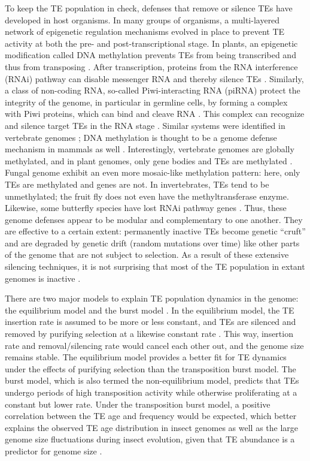 To keep the TE population in check, defenses that remove or silence TEs
have developed in host organisms. In many groups of organisms, a
multi-layered network of epigenetic regulation mechanisms evolved in
place to prevent TE activity at both the pre- and post-transcriptional
stage. In plants, an epigenetic modification called DNA methylation
prevents TEs from being transcribed and thus from transposing
\citep{Slotkin2007, Lisch2009}. After transcription, proteins from the
RNA interference (RNAi) pathway can disable messenger RNA and thereby
silence TEs \citep{Buchon2006}. Similarly, a class of non-coding RNA,
so-called Piwi-interacting RNA (piRNA) protect the integrity of the
genome, in particular in germline cells, by forming a complex with Piwi
proteins, which can bind and cleave RNA \citep{Zeng2011}. This complex
can recognize and silence target TEs in the RNA stage \citep{Siomi2011, Mondal2018}.
Similar systems were identified in vertebrate genomes \citep{Suzuki2008,
Schubeler2015}; DNA methylation is thought to be a genome defense
mechanism in mammals as well \citep{Yoder1997}. Interestingly,
vertebrate genomes are globally methylated, and in plant genomes, only
gene bodies and TEs are methylated \citep{Suzuki2008}. Fungal genome
exhibit an even more mosaic-like methylation pattern: here, only TEs are
methylated and genes are not. In invertebrates, TEs tend to be
unmethylated; the fruit fly  does not
even have the methyltransferase enzyme. Likewise, some butterfly species
have lost RNAi pathway genes \citep{Pauli2016}. Thus, these genome
defenses appear to be modular and complementary to one another. They are
effective to a certain extent: permanently inactive TEs become genetic
``cruft'' and are degraded by genetic drift (random mutations over time)
like other parts of the genome that are not subject to selection. As a
result of these extensive silencing techniques, it is not surprising
that most of the TE population in extant genomes is inactive
\citep{Yoder1997, Zilberman2007}.

There are two major models to explain TE population dynamics in the
genome: the equilibrium model and the burst model \citep{Petrov2011,
Kofler2012, Cridland2013, Blumenstiel2014}. In the equilibrium model,
the TE insertion rate is assumed to be more or less constant, and TEs
are silenced and removed by purifying selection at a likewise constant
rate \citep{Charlesworth1983}. This way, insertion rate and
removal/silencing rate would cancel each other out, and the genome size
remains stable.  The equilibrium model provides a better fit for TE
dynamics under the effects of purifying selection \citep{Barron2014}
than the transposition burst model. The burst model, which is also
termed the non-equilibrium model, predicts that TEs undergo periods of
high transposition activity while otherwise proliferating at a constant
but lower rate. Under the transposition burst model, a positive
correlation between the TE age and frequency would be expected, which
better explains the observed TE age distribution in insect genomes as
well as the large genome size fluctuations during insect evolution,
given that TE abundance is a predictor for genome size
\citep{Alfsnes2017, Petersen2018-1}.

